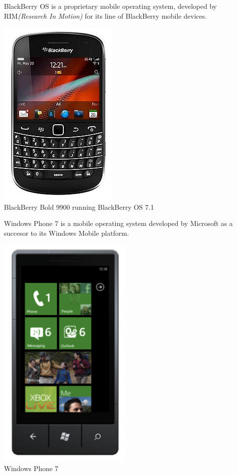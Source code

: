 BlackBerry OS is a proprietary mobile operating system, developed by RIM\emph{(Research In Motion)} for its line of BlackBerry mobile devices.

\begin{centering}
\includegraphics[scale=0.5]{images/Blackberrybold9900.jpg}\\{BlackBerry Bold 9900 running BlackBerry OS 7.1}\\
\end{centering}


Windows Phone 7 is a mobile operating system developed by Microsoft as a succesor to its Windows Mobile platform.

\begin{centering}
\includegraphics[scale=0.35]{images/WindowsPhone7.png}\\{Windows Phone 7}\\
\end{centering}


